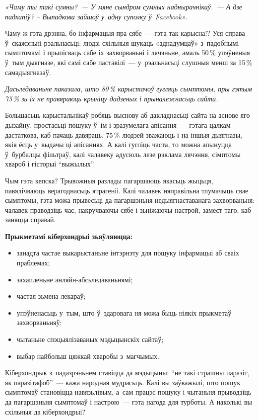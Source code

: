 \emph{«Чаму ты такі сумны?~--- У мяне сындром сумных наднырачнікаў.~--- А дзе падхапіў? -- Выпадкова зайшоў у~адну суполку ў~Facebook».} 

Чаму ж гэта дрэнна, бо інфармацыя пра сябе~--- гэта так карысна!? Уся справа ў~скажэньні рэальнасьці: людзі схільныя шукаць «аднадумцаў» з~падобнымі сымптомамі і прыпісваць сабе іх захворваньні і лячэньне, амаль 50\,\% упэўненыя ў~тым дыягназе, які самі сабе паставілі~--- у~рэальнасьці слушныя менш за 15\,\% самадыягназаў.

\emph{Дасьледаваньне паказала, што 80\,\% карыстачоў гугляць сымптомы, пры гэтым 75\,\% зь іх не правяраюць крыніцу дадзеных і прыналежнасьць сайта.}

Большасьць карыстальнікаў робяць выснову аб дакладнасьці сайта на аснове яго дызайну, простасьці пошуку ў~ім і зразумелага апісання~--- гэтага цалкам дастаткова, каб пачаць давяраць. 75\,\% людзей зважаюць і на іншыя дыягназы, якія ёсць у~выдачы ці апісаннях. А калі гугліць часта, то можна апынуцца ў~бурбалцы фільтраў, калі чалавеку адусюль лезе рэклама лячэння, сімптомы хвароб і гісторыі ``выжылых''.


Чым гэта кепска? Трывожныя разлады пагаршаюць якасьць жыцьця, павялічваюць верагоднасьць ятрагеніі. Калі чалавек няправільна тлумачыць свае сымптомы, гэта можа прывесьці да пагаршэньня недыягнаставанага захворваньня: чалавек праводзіць час, накручваючы сябе і зьніжаючы настрой, замест таго, каб заняцца справай. 

\textbf{Прыкметамі кіберхондрыі зьяўляюцца:} 
\begin{itemize}
  \item занадта частае выкарыстаньне інтэрнэту для пошуку інфармацыі аб сваіх праблемах;
  \item захапленьне анляйн-абсьледаваньнямі;
  \item частая зьмена лекараў;
  \item упэўненасьць у~тым, што ў~здаровага ня можа быць ніякіх прыкметаў захворваньняў;
  \item чытаньне спэцыялізаваных мэдыцынскіх сайтаў;
  \item выбар найбольш цяжкай хваробы з~магчымых.
\end{itemize}

Кіберхондрык з~падазрэньнем ставіцца да мэдыцыны: ``не такі страшны паразіт, як паразітафоб''~--- кажа народная мудрасьць. Калі вы заўважылі, што пошук сымптомаў становіцца навязьлівым, а~сам працэс пошуку і чытаньня прыводзіць да пагаршэньня сымптомаў і настрою~--- гэта нагода для турботы. А наколькі вы схільныя да кіберхондрыі?

